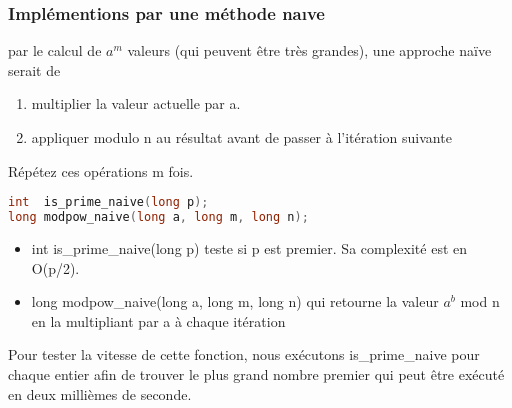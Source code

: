 \documentclass{article}
\begin{document}
\subsubsection{Implémentions par une méthode naıve}
par le calcul de $a^m$ valeurs (qui peuvent être très grandes), une approche naïve serait de
\begin{enumerate}
\item multiplier la valeur actuelle par a.
\item appliquer modulo n au résultat avant de passer à l'itération suivante
\end{enumerate}
Répétez ces opérations m fois.
\begin{lstlisting}[language={C}]
int  is_prime_naive(long p);
long modpow_naive(long a, long m, long n);
\end{lstlisting}
\begin{itemize}
\item int is\_prime\_naive(long p) teste si p est premier. Sa complexité est en O(p/2).
\item long modpow\_naive(long a, long m, long n) qui retourne la valeur $a^b$ mod n en la multipliant par a à chaque itération
\end{itemize}
Pour tester la vitesse de cette fonction, nous exécutons is\_prime\_naive pour chaque entier afin de trouver le plus grand nombre premier qui peut être exécuté en deux millièmes de seconde.
\end{document}
